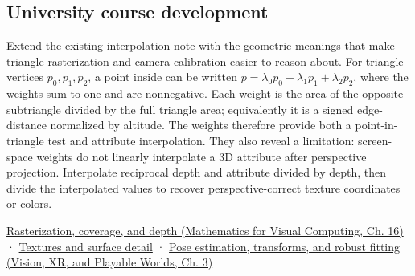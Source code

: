 \subsection{University course development}\label{appendix-02b9d9a81dca-university-course-development}

\hypertarget{appendix-02b9d9a81dca-university-course-development}{}

Extend the existing interpolation note with the geometric meanings that make triangle rasterization and camera calibration easier to reason about. For triangle vertices \(p_0,p_1,p_2\), a point inside can be written \(p=\lambda_0p_0+\lambda_1p_1+\lambda_2p_2\), where the weights sum to one and are nonnegative. Each weight is the area of the opposite subtriangle divided by the full triangle area; equivalently it is a signed edge-distance normalized by altitude. The weights therefore provide both a point-in-triangle test and attribute interpolation. They also reveal a limitation: screen-space weights do not linearly interpolate a 3D attribute after perspective projection. Interpolate reciprocal depth and attribute divided by depth, then divide the interpolated values to recover perspective-correct texture coordinates or colors.

\href{../02-Mathematics-for-Visual-Computing/main.pdf\#nameddest=03-visual-computing-i-ch012-rasterization-coverage-and-depth}{Rasterization, coverage, and depth (Mathematics for Visual Computing, Ch. 16)} · \hyperref[03-visual-computing-i-ch019-textures-and-surface-detail]{Textures and surface detail} · \href{../07-Vision-XR-and-Playable-Worlds/main.pdf\#nameddest=04-visual-computing-ii-ch032-pose-estimation-transforms-and-robust-fitting}{Pose estimation, transforms, and robust fitting (Vision, XR, and Playable Worlds, Ch. 3)}
